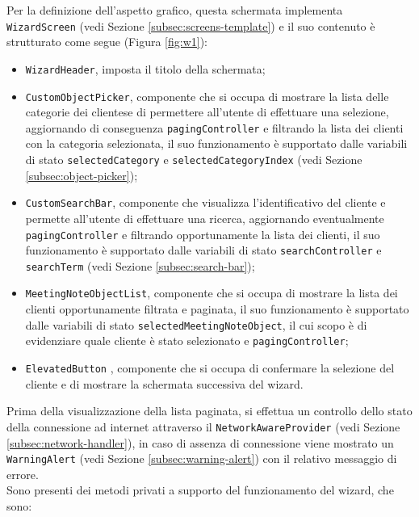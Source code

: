 Per la definizione dell'aspetto grafico, questa schermata implementa \lstinline{WizardScreen} (vedi Sezione \ref{subsec:screens-template}) e il suo contenuto è strutturato come segue (Figura \ref{fig:w1}):
\begin{itemize}
    \item \lstinline{WizardHeader}, imposta il titolo della schermata;
    \item \lstinline{CustomObjectPicker}, componente che si occupa di mostrare la lista delle categorie dei \glspl{cliente}\glsoccur e di permettere all'utente di effettuare una selezione, aggiornando di conseguenza \lstinline{pagingController} e filtrando la lista dei clienti con la categoria selezionata, il suo funzionamento è supportato dalle variabili di stato \lstinline{selectedCategory} e \lstinline{selectedCategoryIndex} (vedi Sezione \ref{subsec:object-picker});
    \item \lstinline{CustomSearchBar}, componente che visualizza l'identificativo del cliente e permette all'utente di effettuare una ricerca, aggiornando eventualmente \lstinline{pagingController} e filtrando opportunamente la lista dei clienti, il suo funzionamento è supportato dalle variabili di stato \lstinline{searchController} e \lstinline{searchTerm} (vedi Sezione \ref{subsec:search-bar});
    \item \lstinline{MeetingNoteObjectList}, componente che si occupa di mostrare la lista dei clienti opportunamente filtrata e paginata, il suo funzionamento è supportato dalle variabili di stato \lstinline{selectedMeetingNoteObject}, il cui scopo è di evidenziare quale cliente è stato selezionato e \lstinline{pagingController};
    \item \lstinline{ElevatedButton} \cite{site:elevated-button}, componente che si occupa di confermare la selezione del cliente e di mostrare la schermata successiva del \gls{wizard}\glsoccur.
\end{itemize}
Prima della visualizzazione della lista paginata, si effettua un controllo dello stato della connessione ad internet attraverso il \lstinline{NetworkAwareProvider} (vedi Sezione \ref{subsec:network-handler}), in caso di assenza di connessione viene mostrato un \lstinline{WarningAlert} (vedi Sezione \ref{subsec:warning-alert}) con il relativo messaggio di errore. \\
Sono presenti dei metodi privati a supporto del funzionamento del \gls{wizard}\glsoccur, che sono:
